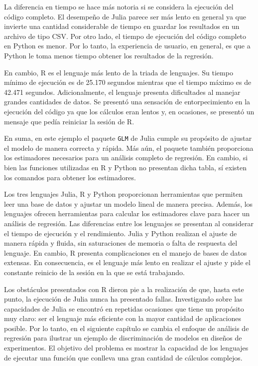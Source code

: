 La diferencia en tiempo se hace más notoria si se considera la ejecución del código completo. El desempeño de \textsf{Julia} parece ser más lento en general ya que invierte una cantidad considerable de tiempo en guardar los resultados en un archivo de tipo \textsf{CSV}. Por otro lado, el tiempo de ejecución del código completo en \textsf{Python} es menor. Por lo tanto, la experiencia de usuario, en general, es que a \textsf{Python} le toma menos tiempo obtener los resultados de la regresión. 

En cambio, \textsf{R} es el lenguaje más lento de la triada de lenguajes. Su tiempo mínimo de ejecución es de 25.170 segundos mientras que el tiempo máximo es de 42.471 segundos. Adicionalmente, el lenguaje presenta dificultades al manejar grandes cantidades de datos. Se presentó una sensación de entorpecimiento en la ejecución del código ya que los cálculos eran lentos y, en ocasiones, se presentó un mensaje que pedía reiniciar la sesión de \textsf{R}.   

En suma, en este ejemplo el paquete \texttt{GLM} de \textsf{Julia} cumple su propósito de ajustar el modelo de manera correcta y rápida. Más aún, el paquete también proporciona los estimadores necesarios para un análisis completo de regresión. En cambio, si bien las funciones utilizadas en \textsf{R} y \textsf{Python} no presentan dicha tabla, sí existen los comandos para obtener los estimadores. 

Los tres lenguajes \textsf{Julia, R} y \textsf{Python} proporcionan herramientas que permiten leer una base de datos y ajustar un modelo lineal de manera precisa. Además, los lenguajes ofrecen herramientas para calcular los estimadores clave para hacer un análisis de regresión. Las diferencias entre los lenguajes se presentan al considerar el tiempo de ejecución y el rendimiento. \textsf{Julia} y \textsf{Python} realizan el ajuste de manera rápida y fluida, sin saturaciones de memoria o falta de respuesta del lenguaje. En cambio, \textsf{R} presenta complicaciones en el manejo de bases de datos extensas. En consecuencia, es el lenguaje más lento en realizar el ajuste y pide el constante reinicio de la sesión en la que se está trabajando. 

Los obstáculos presentados con \textsf{R} dieron pie a la realización de que, hasta este punto, la ejecución de \textsf{Julia} nunca ha presentado fallas. Investigando sobre las capacidades de \textsf{Julia} se encontró en repetidas ocasiones que tiene un propósito muy claro: ser  el lenguaje más eficiente con la mayor cantidad de aplicaciones posible. Por lo tanto, en el siguiente capítulo se cambia el enfoque de análisis de regresión para ilustrar un ejemplo de discriminación de modelos en diseños de experimentos. El objetivo del problema es mostrar la capacidad de los lenguajes de ejecutar una función que conlleva una gran cantidad de cálculos complejos. 

